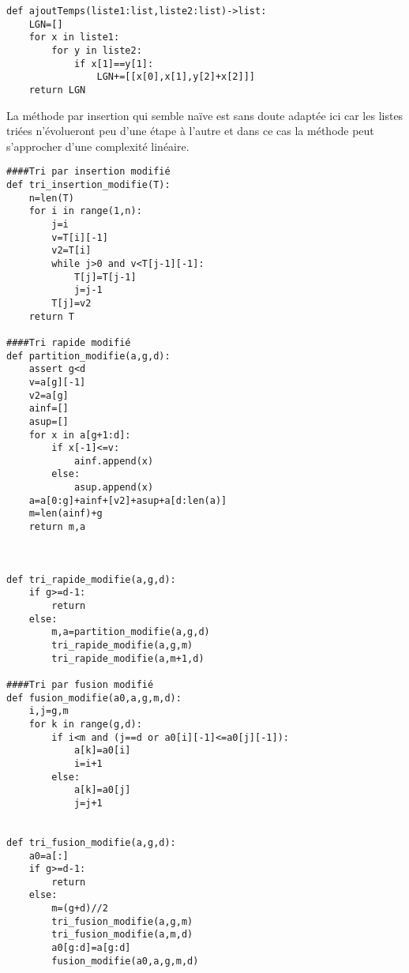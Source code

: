 

\begin{lstlisting}
def ajoutTemps(liste1:list,liste2:list)->list:
    LGN=[]
    for x in liste1:
        for y in liste2:
            if x[1]==y[1]:
                LGN+=[[x[0],x[1],y[2]+x[2]]]
    return LGN
\end{lstlisting}



La méthode par insertion qui semble naïve est sans doute adaptée ici car les listes triées n'évolueront peu d'une étape à l'autre et dans ce cas la méthode peut s'approcher d'une complexité linéaire.



\begin{lstlisting}
####Tri par insertion modifié
def tri_insertion_modifie(T):
    n=len(T)
    for i in range(1,n):
        j=i
        v=T[i][-1]
        v2=T[i]
        while j>0 and v<T[j-1][-1]:
            T[j]=T[j-1]
            j=j-1
        T[j]=v2
    return T

####Tri rapide modifié
def partition_modifie(a,g,d):
    assert g<d
    v=a[g][-1]
    v2=a[g]
    ainf=[]
    asup=[]
    for x in a[g+1:d]:
        if x[-1]<=v:
            ainf.append(x)
        else:
            asup.append(x)
    a=a[0:g]+ainf+[v2]+asup+a[d:len(a)]
    m=len(ainf)+g
    return m,a



def tri_rapide_modifie(a,g,d):
    if g>=d-1:
        return
    else:
        m,a=partition_modifie(a,g,d)
        tri_rapide_modifie(a,g,m)
        tri_rapide_modifie(a,m+1,d)

####Tri par fusion modifié
def fusion_modifie(a0,a,g,m,d):
    i,j=g,m
    for k in range(g,d):
        if i<m and (j==d or a0[i][-1]<=a0[j][-1]):
            a[k]=a0[i]
            i=i+1
        else:
            a[k]=a0[j]
            j=j+1


def tri_fusion_modifie(a,g,d):
    a0=a[:]
    if g>=d-1:
        return
    else:
        m=(g+d)//2
        tri_fusion_modifie(a,g,m)
        tri_fusion_modifie(a,m,d)
        a0[g:d]=a[g:d]
        fusion_modifie(a0,a,g,m,d)

\end{lstlisting}



